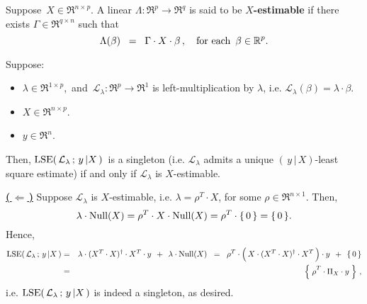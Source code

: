 \begin{definition}
\mbox{}\vskip 0.1cm\noindent
Suppose \,$X \in \Re^{n \times p}$.
A linear $\Lambda : \Re^{p} \longrightarrow \Re^{q}$ is said to be \textbf{$X$-estimable}
if there exists $\Gamma \in \Re^{q \times n}$ such that
\begin{equation*}
\Lambda(\beta) \;\; =\;\; \Gamma \cdot X \cdot \beta\,,
\quad
\textnormal{for each \,$\beta \in \Re^{p}$}.
\end{equation*}
\end{definition}

\begin{theorem}
\label{EstimabilityImpliesUniqueLSE}
\mbox{}\vskip 0.1cm\noindent
Suppose:
\begin{itemize}
\item
	$\lambda \in \Re^{1 \times p}$,\,
	and
	\,$\mathcal{L}_{\lambda} : \Re^{p} \longrightarrow \Re^{1}$ is left-multiplication by $\lambda$,
	i.e. $\mathcal{L}_{\lambda}(\beta) = \lambda \cdot \beta$.
\item
	$X \in \Re^{n \times p}$.
\item
	$y \in \Re^{n}$.
\end{itemize}
Then,
	$\lse\!\left(\,\mathcal{L}_{\lambda} \,;\, y\,\vert X\,\right)$\,
	is a singleton (i.e. $\mathcal{L}_{\lambda}$ admits a unique $(\,y\,\vert\,X)$-least square estimate)
	if and only if $\mathcal{L}_{\lambda}$ is $X$-estimable.
\end{theorem}
\proof
\vskip 0.2cm\noindent
\underline{\textbf{(\,$\Longleftarrow$\,)}}\quad
Suppose $\mathcal{L}_{\lambda}$ is $X$-estimable, i.e. $\lambda = \rho^{T} \cdot X$,
for some $\rho \in \Re^{n \times 1}$.
Then,
\begin{equation*}
\lambda\cdot\Null(X) = \rho^{T} \cdot X \cdot \Null(X) = \rho^{T} \cdot \{\,0\,\} = \{\,0\,\}.
\end{equation*}
Hence,
\begin{eqnarray*}
\lse\!\left(\,\mathcal{L}_{\lambda} \,;\, y\,\vert X\,\right)
&=&
	\lambda \cdot (X^{T} \cdot X)^{\dagger} \cdot X^{T} \cdot y \;\, + \;\, \lambda \cdot \Null(X)
\;\;=\;\;
	\rho^{T} \cdot \left(\,\overset{{\color{white}.}}{X} \cdot (X^{T} \cdot X)^{\dagger} \cdot X^{T}\,\right) \cdot y \;\, + \;\, \{\,0\,\}
\\
&=&
	\left\{\; \overset{{\color{white}.}}{\rho}^{T} \cdot \Pi_{X} \cdot y \;\right\}\,,
\end{eqnarray*}
i.e. $\lse\!\left(\,\mathcal{L}_{\lambda} \,;\, y\,\vert X\,\right)$ is indeed a singleton, as desired.

